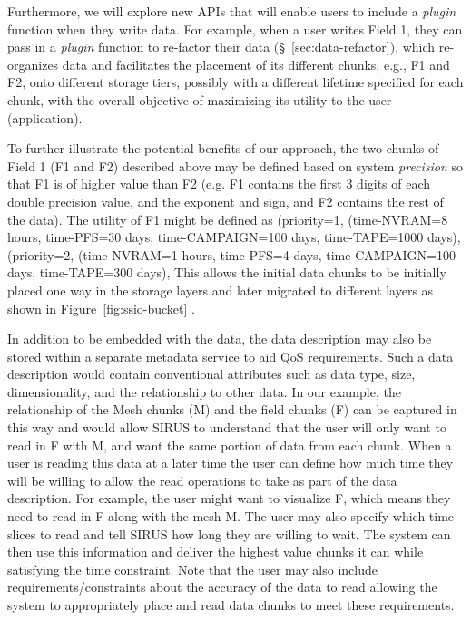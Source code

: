 Furthermore, we will explore new APIs that will enable users to include a {\it plugin} function when 
they write data. For example, when a user writes Field 1, they can pass in a {\it plugin} function 
to re-factor their data (\S~\ref{sec:data-refactor}), which re-organizes data and facilitates the 
placement of its different chunks, e.g., F1 and F2,  onto different storage tiers, possibly with 
a different lifetime specified for each chunk, with the overall objective of maximizing its 
utility to the user (application).

To further illustrate the potential benefits of our approach, the two chunks of Field 1 (F1 and F2) 
described above may be defined based on system {\it precision} so that F1 is of higher value 
than F2 (e.g. F1 contains the first 3 digits of each double precision value, and the exponent and 
sign, and F2 contains the rest of the data). 
%
The utility of F1 might be defined as (priority=1, (time-NVRAM=8 hours, time-PFS=30 days, time-CAMPAIGN=100 days, time-TAPE=1000 days), 
(priority=2, (time-NVRAM=1 hours, time-PFS=4 days, time-CAMPAIGN=100 days, time-TAPE=300 days), 
This allows the initial data chunks to be initially 
placed one way in the storage layers and later migrated to different layers as shown in 
Figure~\ref{fig:ssio-bucket} .
 
In addition to be embedded with the data, the data description may also be stored within 
a separate metadata service to aid QoS requirements. Such a data description would contain
conventional attributes such as data type, size, dimensionality, and the relationship to other 
data. In our example, the relationship of the Mesh chunks (M) and the field chunks (F) can 
be captured in this way and would allow SIRUS to understand that the user will only 
want to read in F with M, and want the same portion of data from each chunk. 
%
When a user is reading this data at a later time the user can define how much time they will 
be willing to allow the read operations to take as part of the data description. For example, 
the user might want to visualize F, which means they need to read in F along with the mesh 
M. The user may also specify which time slices to read and tell SIRUS how long they 
are willing to wait. The system can then use this information and deliver the highest value 
chunks it can while satisfying the time constraint.  Note that the user may also include 
requirements/constraints about the accuracy of the data to read allowing the system to 
appropriately place and read data chunks to meet these requirements.

